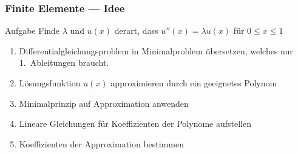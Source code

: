 %
%
%
\begin{frame}
\frametitle{Finite Elemente --- Idee}
\begin{block}{Aufgabe}
Finde $\lambda$ und $u(x)$ derart, dass $u''(x)=\lambda u(x)$ für $0\le x\le 1$
\end{block}

\begin{enumerate}
\item
Differentialgleichungsproblem in Minimalproblem übersetzen, welches nur
1.~Ableitungen braucht.
\item
Lösungsfunktion $u(x)$ approximieren durch ein geeignetes Polynom
\item
Minimalprinzip auf Approximation anwenden
\item
Lineare Gleichungen für Koeffizienten der Polynome aufstellen
\item
Koeffizienten der Approximation bestimmen
\end{enumerate}


\end{frame}

